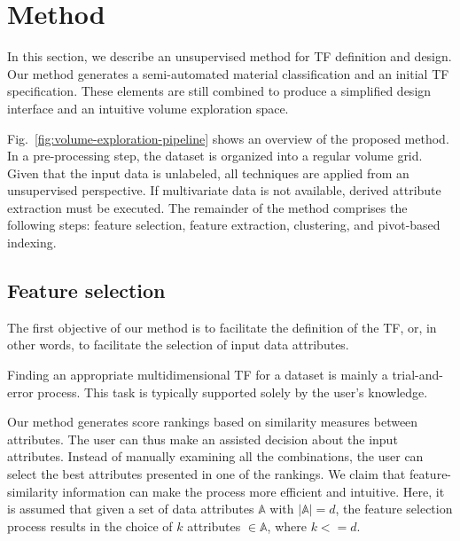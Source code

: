 \section{Method}
\label{sect:method}
In this section, we describe an unsupervised method for TF definition and design. Our method generates a semi-automated material classification and an initial TF specification. These elements are still combined to produce a simplified design interface and an intuitive volume exploration space. 

Fig.~\ref{fig:volume-exploration-pipeline} shows an overview of the proposed method. In a pre-processing step, the dataset is organized into a regular volume grid. Given that the input data is unlabeled, all techniques are applied from an unsupervised perspective. If multivariate data is not available, derived attribute extraction must be executed. The remainder of the method comprises the following steps: feature selection, feature extraction, clustering, and pivot-based indexing.

\begin{figure*}[htb!]
    \centering
    \caption{Overview of the proposed unsupervised method for transfer function definition and design.}
    \label{fig:volume-exploration-pipeline}
%    
\end{figure*}


\subsection{Feature selection}
\label{subsect:feature-selection}

The first objective of our method is to facilitate the definition of the TF, or, in other words, to facilitate the selection of input data attributes.

Finding an appropriate multidimensional TF for a dataset is mainly a trial-and-error process. This task is typically supported solely by the user's knowledge.

Our method generates score rankings based on similarity measures between attributes. The user can thus make an assisted decision about the input attributes. Instead of manually examining all the combinations, the user can select the best attributes presented in one of the rankings. We claim that feature-similarity information can make the process more efficient and intuitive. Here, it is assumed that given a set of data attributes $\mathbb{A}$ with $|\mathbb{A}| = d$, the feature selection process results in the choice of $k$ attributes $\in \mathbb{A}$, where $k <= d$.


